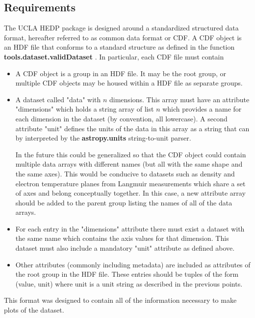 \documentclass[12pt]{article}
\newcommand{\loc}[1]{
{\bf \fontfamily{pcr}\selectfont #1}
}
\newcommand{\todo}[1]{ \begin{tcolorbox} \centering  #1 \end{tcolorbox}}
\begin{document}
\subsection{Requirements}

The UCLA HEDP package is designed around a standardized structured data format, hereafter referred to as common data format or CDF. A CDF object is an HDF file that conforms to a standard structure as defined in the function \loc{tools.dataset.validDataset}. In particular, each CDF file must contain

\begin{itemize}

\item A CDF object is a group in an HDF file. It may be the root group, or multiple CDF objects may be housed within a HDF file as separate groups.

\item A dataset called "data" with $n$ dimensions. This array must have an attribute "dimensions" which holds a string array of list $n$ which provides a name for each dimension in the dataset (by convention, all lowercase). A second attribute "unit" defines the units of the data in this array as a string that can by interpreted by the \loc{astropy.units} string-to-unit parser. 

\todo{In the future this could be generalized so that the CDF object could contain multiple data arrays with different names (but all with the same shape and the same axes). This would be conducive to datasets such as density and electron temperature planes from Langmuir measurements which share a set of axes and belong conceptually together. In this case, a new attribute array should be added to the parent group listing the names of all of the data arrays. }

\item For each entry in the "dimensions" attribute there must exist a dataset with the same name which contains the axis values for that dimension. This dataset must also include a mandatory "unit" attribute as defined above.

\item Other attributes (commonly including metadata) are included as attributes of the root group in the HDF file. These entries should be tuples of the form (value, unit) where unit is a unit string as described in the previous points.

\end{itemize}

This format was designed to contain all of the information necessary to make plots of the dataset.
\end{document}
